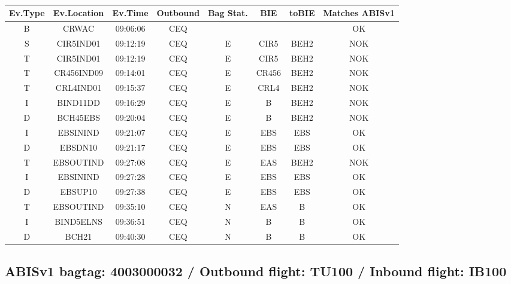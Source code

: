 \documentclass{report}
\begin{document}
\paragraph{}
\begin{longtable}{cccccccc}    \toprule
\rowcolor{white!50}
\textbf{Ev.Type} & \textbf{Ev.Location} & \textbf{Ev.Time} & \textbf{Outbound} & \textbf{Bag Stat.} & \textbf{BIE} & \textbf{toBIE} & \textbf{Matches ABISv1} \\\midrule
B & CRWAC & 09:06:06  & CEQ &  &  &  & OK\\
S & CIR5IND01 & 09:12:19  & CEQ & E & CIR5 & BEH2 & NOK\\
T & CIR5IND01 & 09:12:19  & CEQ & E & CIR5 & BEH2 & NOK\\
T & CR456IND09 & 09:14:01  & CEQ & E & CR456 & BEH2 & NOK\\
T & CRL4IND01 & 09:15:37  & CEQ & E & CRL4 & BEH2 & NOK\\
I & BIND11DD & 09:16:29  & CEQ & E & B & BEH2 & NOK\\
D & BCH45EBS & 09:20:04  & CEQ & E & B & BEH2 & NOK\\
I & EBSININD & 09:21:07  & CEQ & E & EBS & EBS & OK\\
D & EBSDN10 & 09:21:17  & CEQ & E & EBS & EBS & OK\\
T & EBSOUTIND & 09:27:08  & CEQ & E & EAS & BEH2 & NOK\\
I & EBSININD & 09:27:28  & CEQ & E & EBS & EBS & OK\\
D & EBSUP10 & 09:27:38  & CEQ & E & EBS & EBS & OK\\
T & EBSOUTIND & 09:35:10  & CEQ & N & EAS & B & OK\\
I & BIND5ELNS & 09:36:51  & CEQ & N & B & B & OK\\
D & BCH21 & 09:40:30  & CEQ & N & B & B & OK\\
\bottomrule
\end{longtable}
\subsection*{ABISv1 bagtag: 4003000032 / Outbound flight: TU100 / Inbound flight: IB100}
\end{document}

